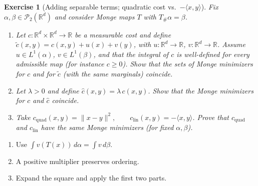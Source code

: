 \documentclass[11pt,a4paper]{article}
\theoremstyle{exostyle}
\newtheorem{exercise}{Exercise}
\newcommand{\push}{\#}
\begin{document}
\begin{exercise}[Adding separable terms; quadratic cost vs.\ $-\langle x,y\rangle$]\label{ex:add-separable}
Fix $\alpha,\beta\in\mathcal P_2(\mathbb{R}^d)$ and consider Monge maps $T$ with $T_{\push}\alpha=\beta$.

\begin{enumerate}[label=(\alph*), itemsep=4pt]
\item
Let $c:\mathbb{R}^d\times\mathbb{R}^d\to\mathbb{R}$ be a measurable cost and define
$\tilde c(x,y)=c(x,y)+u(x)+v(y)$, with $u:\mathbb{R}^d\to\mathbb{R}$, $v:\mathbb{R}^d\to\mathbb{R}$. Assume $u\in L^1(\alpha)$, $v\in L^1(\beta)$, and that the integral of $c$ is well-defined for every admissible map (for instance $c\ge0$).
Show that the sets of Monge minimizers for $c$ and for $\tilde c$ (with the same marginals) coincide.

\item
Let $\lambda>0$ and define $\hat c(x,y)=\lambda\,c(x,y)$.
Show that the Monge minimizers for $c$ and $\hat c$ coincide.

\item Take
$c_{\mathrm{quad}}(x,y)=\|x-y\|^2,\qquad c_{\mathrm{lin}}(x,y)=-\langle x,y\rangle$.
Prove that $c_{\mathrm{quad}}$ and $c_{\mathrm{lin}}$ have the same Monge minimizers (for fixed $\alpha,\beta$).
\end{enumerate}
\end{exercise}
\begin{hints}
\begin{enumerate}[label=(\alph*)]\item Use $\int v(T(x))\,d\alpha=\int v\,d\beta$.\item A positive multiplier preserves ordering.\item Expand the square and apply the first two parts.\end{enumerate}
\end{hints}
\end{document}
